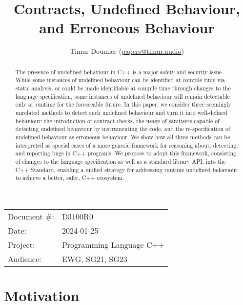 

 \usepackage[bottom]{footmisc} 


\title{Contracts, Undefined Behaviour, and Erroneous Behaviour}
\author{ Timur Doumler \small(\href{mailto:papers@timur.audio}{papers@timur.audio})  
}
\date{}
\maketitle

\begin{tabular}{ll}
Document \#: & D3100R0 \\
Date: &2024-01-25 \\
Project: & Programming Language C++ \\
Audience: & EWG, SG21, SG23
\end{tabular}

\begin{abstract}
The presence of undefined behaviour in C++ is a major safety and security issue. While some instances of undefined behaviour can be identified at compile time via static analysis, or could be made identifiable at compile time through changes to the language specification, some instances of undefined behaviour will remain detectable only at runtime for the foreseeable future. In this paper, we consider three seemingly unrelated methods to detect such undefined behaviour and turn it into well-defined behaviour: the introduction of contract checks, the usage of sanitisers capable of detecting undefined behaviour by instrumenting the code, and the re-specification of undefined behaviour as erroneous behaviour. We show how all three methods can be interpreted as special cases of a more generic framework for reasoning about, detecting, and reporting bugs in C++ programs. We propose to adopt this framework, consisting of changes to the language specification as well as a standard library API, into the C++ Standard, enabling a unified strategy for addressing runtime undefined behaviour to achieve a better, safer, C++ ecosystem.
\end{abstract}

\section{Motivation}
\label{sec:intro}

